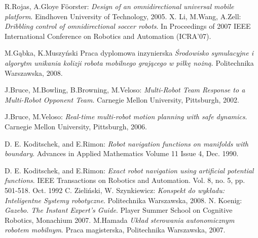 \begin{thebibliography}{9}
	R.Rojas, A.Gloye F\"{o}orster:
	\emph{ Design of an omnidirectional universal mobile platform}.
	  Eindhoven University of Technology, 2005.	  
	X. Li, M.Wang, A.Zell:
	\emph{ Dribbling control of omnidirectional soccer robots}.
	In Proceedings of 2007 IEEE International Conference on Robotics and Automation (ICRA'07).

	M.Gąbka, K.Muszyński
	Praca dyplomowa inzynierska
	\emph{Środowisko symulacyjne i algorytm unikania kolizji robota mobilnego
	grającego w piłkę nożną}.
	Politechnika Warszawska, 2008.

	J.Bruce, M.Bowling, B.Browning, M.Veloso:
	\emph{Multi-Robot Team Response to a Multi-Robot Opponent Team}.
	Carnegie Mellon University, Pittsburgh, 2002.

	J.Bruce, M.Veloso:
	\emph{Real-time multi-robot motion planning with safe dynamics}.
	Carnegie Mellon University, Pittsburgh, 2006.

	D. E. Koditschek, and E.Rimon:
	\emph{Robot navigation functions on manifolds with boundary}.
	Advances in Applied Mathematics
	Volume 11 Issue 4, Dec. 1990.

	D. E. Koditschek, and E.Rimon:
	\emph{Exact robot navigation using artificial potential functions}.
	IEEE Transactions on Robotics and Automation.
	Vol. 8, no. 5, pp. 501-518. Oct. 1992
	C. Zieliński, W. Szynkiewicz:
	\emph{Konspekt do wykładu: Inteligentne Systemy robotyczne}.
	Politechnika Warszawska, 2008.
	N. Koenig:
	\emph{Gazebo. The Instant Expert's Guide}.
	Player Summer School on Cognitive Robotics, Monachium 2007.
 M.Hamada
 \emph{Układ sterowania autonomicznym robotem mobilnym}. Praca magisterska, Politechnika Warszawska, 2007.
\end{thebibliography}
